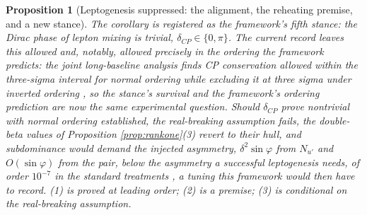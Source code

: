 \documentclass[11pt]{article}
\newtheorem{proposition}[theorem]{Proposition}
\theoremstyle{definition}
\begin{document}
\begin{proposition}[Leptogenesis suppressed: the alignment, the reheating premise, and a new stance]
The corollary is registered as the framework's fifth stance: the Dirac phase of lepton mixing is trivial, $\delta_{CP} \in \{0, \pi\}$. The current record leaves this allowed and, notably, allowed precisely in the ordering the framework predicts: the joint long-baseline analysis finds CP conservation allowed within the three-sigma interval for \emph{normal} ordering while excluding it at three sigma under \emph{inverted} ordering \cite{T2KNOvA2025}, so the stance's survival and the framework's ordering prediction are now the same experimental question. Should $\delta_{CP}$ prove nontrivial with normal ordering established, the real-breaking assumption fails, the double-beta values of Proposition \ref{prop:rankone}(3) revert to their hull, and subdominance would demand the injected asymmetry, $\delta^{2}\sin\varphi$ from $N_{u'}$ and $O(\sin\varphi)$ from the pair, below the asymmetry a successful leptogenesis needs, of order $10^{-7}$ in the standard treatments \cite{DavidsonNardiNir2008}, a tuning this framework would then have to record. (1) is proved at leading order; (2) is a premise; (3) is conditional on the real-breaking assumption.
\end{proposition}
\end{document}
